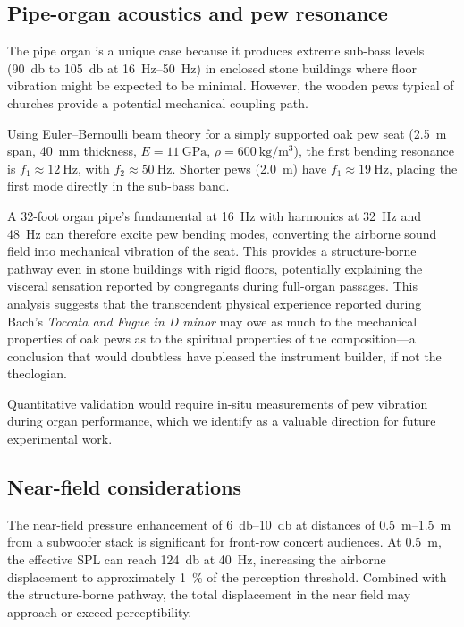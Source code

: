 \subsection{Pipe-organ acoustics and pew resonance}
\label{sec:pipe-organ}

The pipe organ is a unique case because it produces extreme sub-bass
levels (\SI{90}{\decibel} to \SI{105}{\decibel} at
\SIrange{16}{50}{\hertz}) in enclosed stone buildings where floor
vibration might be expected to be minimal.  However, the wooden pews
typical of churches provide a potential mechanical coupling path.

Using Euler--Bernoulli beam theory for a simply supported oak pew seat
(\SI{2.5}{\metre} span, \SI{40}{\milli\metre} thickness,
$E = \SI{11}{\giga\pascal}$, $\rho = \SI{600}{\kilogram\per\metre\cubed}$),
the first bending resonance is $f_1 \approx \SI{12}{\hertz}$, with
$f_2 \approx \SI{50}{\hertz}$.  Shorter pews (\SI{2.0}{\metre}) have
$f_1 \approx \SI{19}{\hertz}$, placing the first mode directly in the
sub-bass band.

A 32-foot organ pipe's fundamental at \SI{16}{\hertz} with harmonics at
\SI{32}{\hertz} and \SI{48}{\hertz} can therefore excite pew bending
modes, converting the airborne sound field into mechanical vibration of
the seat.  This provides a structure-borne pathway even in stone
buildings with rigid floors, potentially explaining the visceral
sensation reported by congregants during full-organ passages.
This analysis suggests that the transcendent physical experience reported
during Bach's \emph{Toccata and Fugue in D minor} may owe as much to the
mechanical properties of oak pews as to the spiritual properties of the
composition---a conclusion that would doubtless have pleased the
instrument builder, if not the theologian.

Quantitative validation would require in-situ measurements of pew
vibration during organ performance, which we identify as a valuable
direction for future experimental work.

\subsection{Near-field considerations}
\label{sec:near-field-discussion}

The near-field pressure enhancement of \SIrange{6}{10}{\decibel}
at distances of \SIrange{0.5}{1.5}{\metre} from a subwoofer stack is
significant for front-row concert audiences.  At \SI{0.5}{\metre}, the
effective SPL can reach \SI{124}{\decibel} at \SI{40}{\hertz},
increasing the airborne displacement to approximately \SI{1}{\percent}
of the perception threshold.  Combined with the structure-borne pathway,
the total displacement in the near field may approach or exceed
perceptibility.

